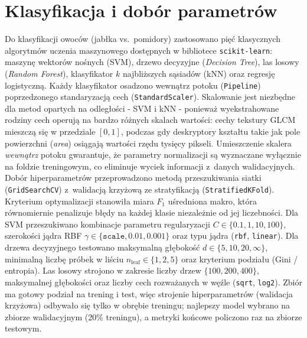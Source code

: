 \documentclass[10pt,a4paper]{article}
\begin{document}
\section{Klasyfikacja i dobór parametrów}

Do klasyfikacji owoców (jabłka vs.\ pomidory) zastosowano pięć klasycznych
algorytmów uczenia maszynowego dostępnych w bibliotece \texttt{scikit-learn}:
maszynę wektorów nośnych (SVM), drzewo decyzyjne (\textit{Decision Tree}),
las losowy (\textit{Random Forest}), klasyfikator $k$ najbliższych sąsiadów
(kNN) oraz regresję logistyczną.
Każdy klasyfikator osadzono wewnątrz potoku (\texttt{Pipeline}) poprzedzonego
standaryzacją cech (\texttt{StandardScaler}).
Skalowanie jest niezbędne dla metod opartych na odległości - SVM i kNN -
ponieważ wyekstrahowane rodziny cech operują na bardzo różnych skalach wartości:
cechy tekstury GLCM mieszczą się w przedziale $[0, 1]$, podczas gdy deskryptory
kształtu takie jak pole powierzchni (\textit{area}) osiągają wartości rzędu
tysięcy pikseli.
Umieszczenie skalera \emph{wewnątrz} potoku gwarantuje, że parametry
normalizacji są wyznaczane wyłącznie na foldzie treningowym, co eliminuje
wyciek informacji z~danych walidacyjnych.
\\

Dobór hiperparametrów przeprowadzono metodą przeszukiwania siatki
(\texttt{GridSearchCV}) z~walidacją krzyżową ze stratyfikacją
(\texttt{StratifiedKFold}).
Kryterium optymalizacji stanowiła miara $F_1$ uśredniona makro, która
równomiernie penalizuje błędy na każdej klasie niezależnie od jej liczebności.
Dla SVM przeszukiwano kombinacje parametru regularyzacji
$C \in \{0.1, 1, 10, 100\}$, szerokości jądra RBF
$\gamma \in \{\texttt{scale}, 0.01, 0.001\}$ oraz typu jądra
(\texttt{rbf}, \texttt{linear}).
Dla drzewa decyzyjnego testowano maksymalną głębokość
$d \in \{5, 10, 20, \infty\}$, minimalną liczbę próbek w liściu
$n_\text{leaf} \in \{1, 2, 5\}$ oraz kryterium podziału (Gini / entropia).
Las losowy strojono w zakresie liczby drzew $\{100, 200, 400\}$, maksymalnej
głębokości oraz liczby cech rozważanych w węźle (\texttt{sqrt}, \texttt{log2}).
Zbiór ma gotowy podział na trening i test, więc strojenie hiperparametrów
(walidacja krzyżowa) odbywało się tylko w obrębie treningu; najlepszy model
wybrano na zbiorze walidacyjnym (20\% treningu), a metryki końcowe policzono
raz na zbiorze testowym.

\end{document}
